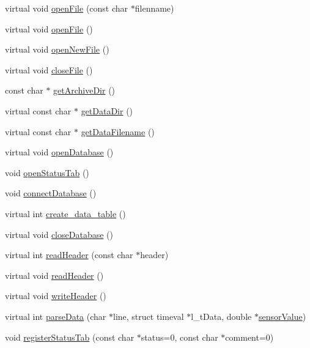 \begin{DoxyCompactItemize}
virtual void \hyperlink{classDAQDevice_aa31998fc15327f4999946adcdbb9f770}{open\-File} (const char $\ast$filenname)
\item 
virtual void \hyperlink{classDAQDevice_a6631b33164c86e7da8d0cd7eca50863f}{open\-File} ()
\item 
virtual void \hyperlink{classDAQDevice_a0626e224d6263cca633f74b0aae65223}{open\-New\-File} ()
\item 
virtual void \hyperlink{classDAQDevice_ae27c5729563be895c0d0a607ee023e30}{close\-File} ()
\item 
const char $\ast$ \hyperlink{classDAQDevice_a45f86e1db8a54d14559ad4f74078a49e}{get\-Archive\-Dir} ()
\item 
virtual const char $\ast$ \hyperlink{classDAQDevice_a7d7d41f0c1496221e589d84b38d1c865}{get\-Data\-Dir} ()
\item 
virtual const char $\ast$ \hyperlink{classDAQDevice_af4734900eb86417b3160a723a077f8f5}{get\-Data\-Filename} ()
\item 
virtual void \hyperlink{classDAQDevice_a32f118d291f1c7b8fe47a16474b825e2}{open\-Database} ()
\item 
void \hyperlink{classDAQDevice_a88a9330a2982674e6e9097790c7e65cb}{open\-Status\-Tab} ()
\item 
void \hyperlink{classDAQDevice_adc401ccdc283c2121a8ef0f5fe67f543}{connect\-Database} ()
\item 
virtual int \hyperlink{classDAQDevice_ac4867b7e5aff2d5c404d6eb1053dda71}{create\-\_\-data\-\_\-table} ()
\item 
virtual void \hyperlink{classDAQDevice_a00f5a8af6622bc8aebcf930f2ae674ac}{close\-Database} ()
\item 
virtual int \hyperlink{classDAQDevice_af5fa373af9a089c18c7fd1d662db144f}{read\-Header} (const char $\ast$header)
\item 
virtual void \hyperlink{classDAQDevice_ac663fe98e445fc57df55dac84a2c9846}{read\-Header} ()
\item 
virtual void \hyperlink{classDAQDevice_aad39c13f039abd6e6a9b0aa21a7c8a4d}{write\-Header} ()
\item 
virtual int \hyperlink{classDAQDevice_a37f6fcab4893285e7f7d74670294a645}{parse\-Data} (char $\ast$line, struct timeval $\ast$l\-\_\-t\-Data, double $\ast$\hyperlink{classDAQDevice_ad148188c57598fdf4fd4c1c333aeb0d8}{sensor\-Value})
\item 
void \hyperlink{classDAQDevice_a3c31d33d7af79b99cc86dc00554e9472}{register\-Status\-Tab} (const char $\ast$status=0, const char $\ast$comment=0)
\item 

\end{DoxyCompactItemize}
